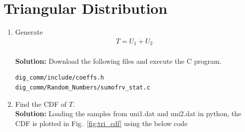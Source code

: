 \documentclass[journal,10pt,twocolumn]{IEEEtran}
\newcommand\figref{Fig.~\ref}
\newcommand{\solution}{\noindent \textbf{Solution: }}
\begin{document}
\section{Triangular Distribution}
%
\begin{enumerate}
\item Generate 
	\begin{align}
		T = U_1+U_2
	\end{align}\\
\solution Download the following files and execute the  C program.
\begin{lstlisting}
dig_comm/include/coeffs.h
dig_comm/Random_Numbers/sumofrv_stat.c
\end{lstlisting}
\item Find the CDF of $T$.\\
\solution Loading the samples from uni1.dat and uni2.dat in python, the CDF is plotted in \figref{fig:tri_cdf} using the below code


\end{enumerate}
\end{document}
